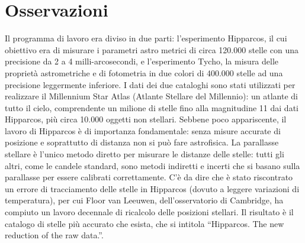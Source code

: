 \documentclass[12pt,a4paper]{article}
\begin{document}
\section*{Osservazioni}
\label{osservazioni}

Il programma di lavoro era diviso in due parti: l'esperimento Hipparcos, il cui obiettivo era di misurare i parametri astro metrici di circa 120.000 stelle con una precisione da 2 a 4 milli-arcosecondi, e l'esperimento Tycho, la misura delle proprietà astrometriche e di fotometria in due colori di 400.000 stelle ad una precisione leggermente inferiore.
I dati dei due cataloghi sono stati utilizzati per realizzare il Millennium Star Atlas (Atlante Stellare del Millennio): un atlante di tutto il cielo, comprendente un milione di stelle fino alla magnitudine 11 dai dati Hipparcos, più circa 10.000 oggetti non stellari.
Sebbene poco appariscente, il lavoro di Hipparcos è di importanza fondamentale: senza misure accurate di posizione e soprattutto di distanza non si può fare astrofisica. La parallasse stellare è l'unico metodo diretto per misurare le distanze delle stelle: tutti gli altri, come le candele standard, sono metodi indiretti e incerti che si basano sulla parallasse per essere calibrati correttamente.
C'è da dire che è stato riscontrato un errore di tracciamento delle stelle in Hipparcos (dovuto a leggere variazioni di temperatura), per cui Floor van Leeuwen, dell'osservatorio di Cambridge, ha compiuto un lavoro decennale di ricalcolo delle posizioni stellari. Il risultato è il catalogo di stelle più accurato che esista, che si intitola ``Hipparcos. The new reduction of the raw data.''.
\end{document}

